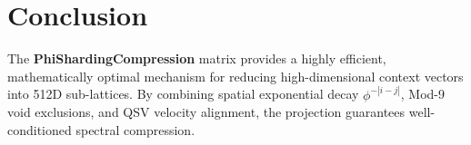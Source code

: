\section{Conclusion}
The \textbf{PhiShardingCompression} matrix provides a highly efficient, mathematically optimal mechanism for reducing high-dimensional context vectors into 512D sub-lattices. By combining spatial exponential decay $\phi^{-|i-j|}$, Mod-9 void exclusions, and QSV velocity alignment, the projection guarantees well-conditioned spectral compression.